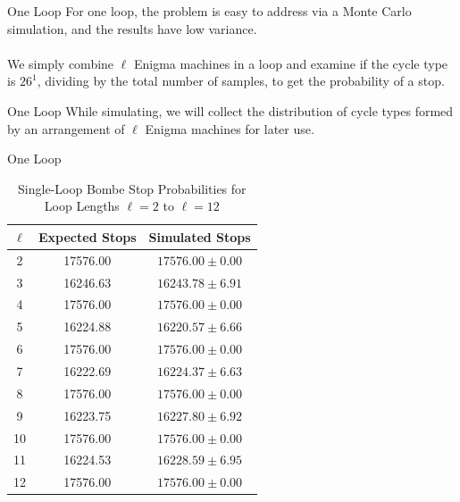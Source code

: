 \documentclass[hyphens,aspectratio=169]{beamer}
\begin{document}
\begin{frame}[fragile]{One Loop}
	For one loop, the problem is easy to address via a Monte Carlo simulation, and the results have low variance.
	\\\\We simply combine $\ell$ Enigma machines in a loop and examine if the cycle type is $26^1$, dividing by the total number of samples, to get the probability of a stop.
\end{frame}

\begin{frame}[fragile]{One Loop}
	\large
	While simulating, we will collect the distribution of cycle types formed by an arrangement of $\ell$ Enigma machines for later use.
\end{frame}

\begin{frame}[fragile]{One Loop}
	\begin{table}[H]
		\centering

		\begin{tabular}{|c|c|c|}
			\hline
			{\bf{ $\ell$ }} & {\bf{ Expected Stops }} & {\bf{ Simulated Stops }} \\
			\hline
			2               & 17576.00                & $17576.00 \pm 0.00$      \\
			\hline
			3               & 16246.63                & $16243.78 \pm 6.91$      \\
			\hline
			4               & 17576.00                & $17576.00 \pm 0.00$      \\
			\hline
			5               & 16224.88                & $16220.57 \pm 6.66$      \\
			\hline
			6               & 17576.00                & $17576.00 \pm 0.00$      \\
			\hline
			7               & 16222.69                & $16224.37 \pm 6.63$      \\
			\hline
			8               & 17576.00                & $17576.00 \pm 0.00$      \\
			\hline
			9               & 16223.75                & $16227.80 \pm 6.92$      \\
			\hline
			10              & 17576.00                & $17576.00 \pm 0.00$      \\
			\hline
			11              & 16224.53                & $16228.59 \pm 6.95$      \\
			\hline
			12              & 17576.00                & $17576.00 \pm 0.00$      \\
			\hline
		\end{tabular}
		\caption{Single-Loop Bombe Stop Probabilities for Loop Lengths
			$\ell=2$ to $\ell=12$}
	\end{table}
\end{frame}
\end{document}
